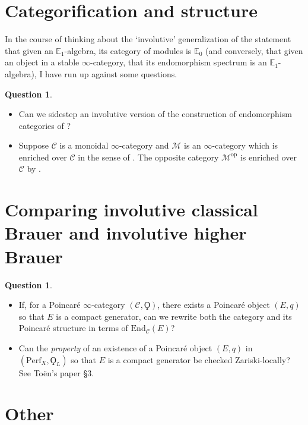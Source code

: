 \documentclass{article}
\newcommand{\EE}{\mathbb{E}}
\newcommand{\op}{\mathrm{op}}
\theoremstyle{definition}
\newtheorem{question}[equation]{Question}
\begin{document}
\section{Categorification and structure}
In the course of thinking about the `involutive' generalization of the statement that given an $ \EE_1 $-algebra, its category of modules is $ \EE_0 $ (and conversely, that given an object in a stable $\infty$-category, that its endomorphism spectrum is an $ \EE_1 $-algebra), I have run up against some questions. 
\begin{question}
\begin{itemize}
    \item Can we sidestep an involutive version of the construction of endomorphism categories of \cite[\S4.7.1]{LurHA}? 
    \item Suppose $ \mathcal{C} $ is a monoidal $ \infty $-category and $ \mathcal{M} $ is an $ \infty $-category which is enriched over $ \mathcal{C} $ in the sense of \cite[\S4.2.1]{LurHA}. 
    The opposite category $ \mathcal{M}^\op $ is enriched over $ \mathcal{C} $ by \cite[\S10]{Heine_2023}.   
\end{itemize}
\end{question}

\section{Comparing involutive classical Brauer and involutive higher Brauer}
\begin{question}
\begin{itemize}
    \item If, for a Poincaré $ \infty $-category $ (\mathcal{C},\Qoppa) $, there exists a Poincaré object $(E,q) $ so that $ E $ is a compact generator, can we rewrite both the category and its Poincaré structure in terms of $ \mathrm{End}_{\mathcal{C}}(E) $? 
    \item Can the \emph{property} of an existence of a Poincaré object $ (E,q) $ in $ \left(\mathrm{Perf}_X, \Qoppa_L \right) $ so that $ E $ is a compact generator be checked Zariski-locally? 
    See Toën's paper \S3.  
\end{itemize}
\end{question}

\section{Other} 
\end{document}
